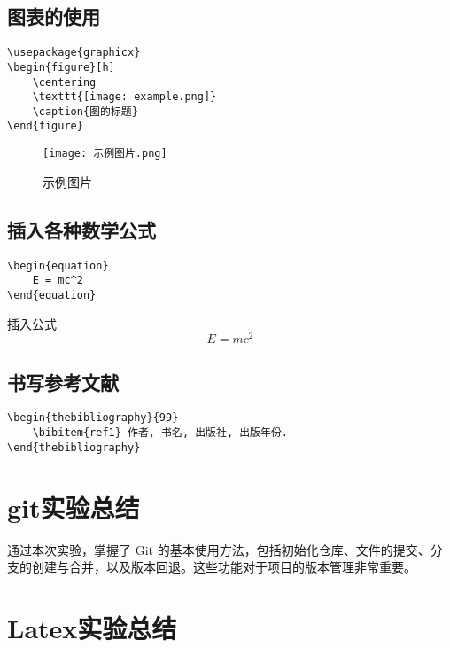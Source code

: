 \documentclass[a4paper, 12pt]{article}
\begin{document}
  
\subsection{图表的使用}
\begin{verbatim}
\usepackage{graphicx}
\begin{figure}[h]
    \centering
    \texttt{[image: example.png]}
    \caption{图的标题}
\end{figure}
  \end{verbatim}


\begin{figure}[H]
    \centering
    \texttt{[image: 示例图片.png]}
    \caption{示例图片}
\end{figure}
  
\subsection{插入各种数学公式}
\begin{verbatim}
\begin{equation}
    E = mc^2
\end{equation}
  \end{verbatim}

插入公式
  \begin{equation}
    E = mc^2
\end{equation}
  
\subsection{书写参考文献}
\begin{verbatim}
\begin{thebibliography}{99}
    \bibitem{ref1} 作者, 书名, 出版社, 出版年份.
\end{thebibliography}
  \end{verbatim}



  \newpage
  \section{git实验总结}
  通过本次实验，掌握了 Git 的基本使用方法，包括初始化仓库、文件的提交、分支的创建与合并，以及版本回退。这些功能对于项目的版本管理非常重要。

  \section{Latex实验总结}
\end{document}
